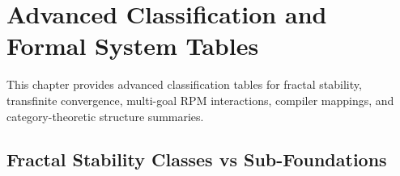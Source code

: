 
\chapter{Advanced Classification and Formal System Tables}
\label{ch:advanced-tables}

\begin{tcolorbox}[colback=blue!5!white,colframe=blue!75!black,title=\vnewfour,breakable]
This chapter provides advanced classification tables for fractal stability,
transfinite convergence, multi-goal RPM interactions, compiler mappings,
and category-theoretic structure summaries.
\end{tcolorbox}

\section{Fractal Stability Classes vs Sub-Foundations}

